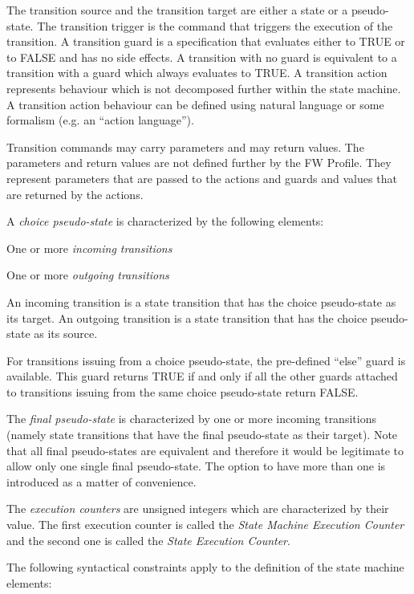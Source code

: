 \documentclass[a4paper,10pt]{article}
\newenvironment{fw_itemize}						%
{\begin{itemize}
  \setlength{\itemsep}{1mm}
  \setlength{\parskip}{0pt}
  \setlength{\parsep}{0pt}}
{\end{itemize}}
\begin{document}
The transition source and the transition target are either a state or a pseudo-state. The transition
trigger is the command that triggers the execution of the transition. A transition guard is a specification that evaluates either to TRUE or to FALSE and has no side effects. A transition with no guard is equivalent to a transition with a guard which always evaluates to TRUE. A transition action represents behaviour which is not decomposed further within the state machine. A transition action behaviour can be defined using natural language or some formalism (e.g. an “action language”).

Transition commands may carry parameters and may return values. The parameters and return
values are not defined further by the FW Profile. They represent parameters that are passed to
the actions and guards and values that are returned by the actions.

A \emph{choice pseudo-state} is characterized by the following elements:

\begin{fw_itemize} 
\item One or more \emph{incoming transitions}
\item One or more \emph{outgoing transitions}
\end{fw_itemize}

An incoming transition is a state transition that has the choice pseudo-state as its target. An
outgoing transition is a state transition that has the choice pseudo-state as its source.

For transitions issuing from a choice pseudo-state, the pre-defined “else” guard is available.
This guard returns TRUE if and only if all the other guards attached to transitions issuing from
the same choice pseudo-state return FALSE.

The \emph{final pseudo-state} is characterized by one or more incoming transitions (namely state
transitions that have the final pseudo-state as their target). Note that all final pseudo-states are
equivalent and therefore it would be legitimate to allow only one single final pseudo-state. The
option to have more than one is introduced as a matter of convenience.

The \emph{execution counters} are unsigned integers which are characterized by their value.
The first execution counter is called the \emph{State Machine Execution Counter} and the second one
is called the \emph{State Execution Counter}.

The following syntactical constraints apply to the definition of the state machine elements:
\end{document}
